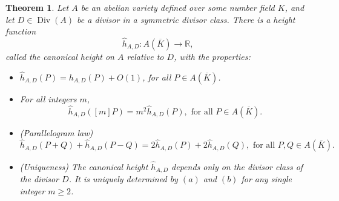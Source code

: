 \documentclass[a4paper, 12pt]{amsart}
\theoremstyle{definition}
\theoremstyle{plain}
\theoremstyle{plain}
\newtheorem{thm0}[defn0]{Theorem}
\theoremstyle{plain}
\theoremstyle{plain}
\theoremstyle{remark}
\theoremstyle{remark}
\theoremstyle{plain}
\newenvironment{theorem}{ \begin{thm0}}{\end{thm0}}
\DeclareMathOperator{\Div}{Div}
\begin{document}
	\begin{theorem}\label{nerontate}
		Let $A$ be an abelian variety defined over some number field $K$, and let $D\in\Div(A)$ be a divisor in a symmetric divisor class. There is a height function
		\begin{equation*}
			\hat{h}_{A,D}:A(\overline{K})\rightarrow\mathbb{R},
		\end{equation*}
		called the canonical height on $A$ relative to $D$, with the properties:
		\begin{itemize}
			\item[(a)]$\hat{h}_{A,D}(P)=h_{A,D}(P)+O(1)$, for all $P\in A(\overline{K})$.
			\item[(b)]For all integers $m$,
			\begin{equation*}
				\hat{h}_{A,D}([m]P)=m^2\hat{h}_{A,D}(P),\text{ for all }P\in A(\overline{K}).
			\end{equation*}
			\item[(c)](Parallelogram law)
			\begin{equation*}
				\hat{h}_{A,D}(P+Q)+\hat{h}_{A,D}(P-Q)=2\hat{h}_{A,D}(P)+2\hat{h}_{A,D}(Q),\text{ for all }P,Q\in A(\overline{K}).
			\end{equation*}
			\item[(d)](Uniqueness) The canonical height $\hat{h}_{A,D}$ depends only on the divisor class of the divisor $D$. It is uniquely determined by $(a)$ and $(b)$ for any single integer $m\ge 2$.
		\end{itemize}
	\end{theorem}
\end{document}
